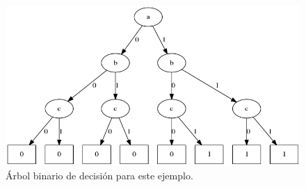 \begin{figure}[h!]
  \centering
  \includegraphics[width=1\textwidth]{Figures/BDT.png}
  \caption{Árbol binario de decisión para este ejemplo.}
  \label{fig:bdt1}
\end{figure}

